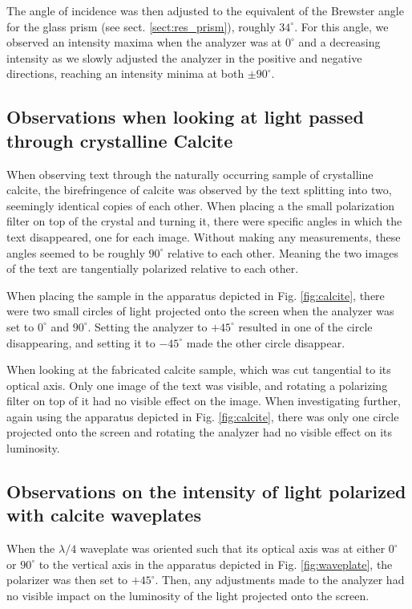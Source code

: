 \documentclass[%
 reprint,
 amsmath,amssymb,
 aps,
]{revtex4-1}
\begin{document}
    The angle of incidence was then adjusted to the equivalent of the Brewster angle for the glass prism (see sect. \ref{sect:res_prism}), roughly $34^\circ$. For this angle, we observed an intensity maxima when the analyzer was at $0^\circ$ and a decreasing intensity as we slowly adjusted the analyzer in the positive and negative directions, reaching an intensity minima at both $\pm 90^\circ$. 

  \subsection{Observations when looking at light passed through crystalline Calcite}
    When observing text through the naturally occurring sample of crystalline calcite, the birefringence of calcite was observed by the text splitting into two, seemingly identical copies of each other. When placing a the small polarization filter on top of the crystal and turning it, there were specific angles in which the text disappeared, one for each image. Without making any measurements, these angles seemed to be roughly $90^\circ$ relative to each other. Meaning the two images of the text are tangentially polarized relative to each other. 

    When placing the sample in the apparatus depicted in Fig. \ref{fig:calcite}, there were two small circles of light projected onto the screen when the analyzer was set to $0^\circ$ and $90^\circ$.  Setting the analyzer to $+45^\circ$ resulted in one of the circle disappearing, and setting it to $-45^\circ$ made the other circle disappear.

    When looking at the fabricated calcite sample, which was cut tangential to its optical axis. Only one image of the text was visible, and rotating a polarizing filter on top of it had no visible effect on the image. When investigating further, again using the apparatus depicted in Fig. \ref{fig:calcite}, there was only one circle projected onto the screen and rotating the analyzer had no visible effect on its luminosity. 

  \subsection{Observations on the intensity of light polarized with calcite waveplates}
    When the $\lambda/4$ waveplate was oriented such that its optical axis was at either $0^\circ$ or $90^\circ$ to the vertical axis in the apparatus depicted in Fig. \ref{fig:waveplate}, the polarizer was then set to $+45^\circ$. Then, any adjustments made to the analyzer had no visible impact on the luminosity of the light projected onto the screen.
\end{document}

